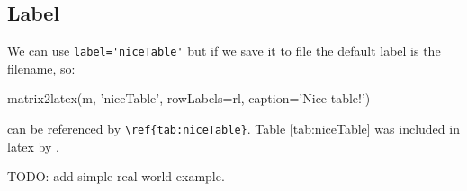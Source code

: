 \subsection{Label}
We can use \lstinline{label='niceTable'} but if we save it to file
the default label is the filename, so:
\begin{sageblock}
matrix2latex(m, 'niceTable', rowLabels=rl, 
                 caption='Nice table!')
\end{sageblock}
can be referenced by \verb!\ref{tab:niceTable}!. Table \ref{tab:niceTable}
was included in latex by \verb!!.


TODO: add simple real world example.


%
%

